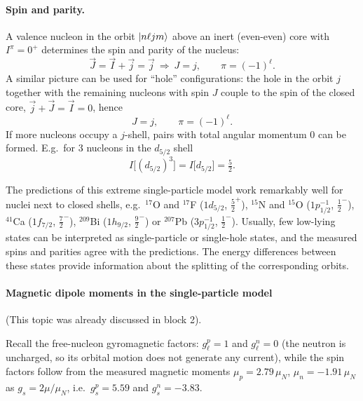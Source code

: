 \documentclass[11pt,a4paper]{article}
\begin{document}
\paragraph{Spin and parity.} A valence nucleon in the orbit $\ket{n\ell jm}$ above an inert (even-even) core with $I^\pi=0^+$ determines the spin and parity of the nucleus:
\[
\vec J=\vec I+\vec j=\vec j\ \Rightarrow\ J=j,\qquad \pi=(-1)^\ell .
\]
A similar picture can be used for ``hole'' configurations: the hole in the orbit $j$ together with the remaining nucleons with spin $J$ couple to the spin of the closed core, $\vec j+\vec J=\vec I=0$, hence
\[
J=j,\qquad \pi=(-1)^\ell .
\]
If more nucleons occupy a $j$-shell, pairs with total angular momentum 0 can be formed. E.g.\ for 3 nucleons in the $d_{5/2}$ shell
\[
I\big[(d_{5/2})^3\big]=I\big[d_{5/2}\big]=\tfrac52 .
\]

The predictions of this extreme single-particle model work remarkably well for nuclei next to closed shells, e.g.\ ${}^{17}$O and ${}^{17}$F ($1d_{5/2}$, $\frac52^+$), ${}^{15}$N and ${}^{15}$O ($1p_{1/2}^{-1}$, $\frac12^-$), ${}^{41}$Ca ($1f_{7/2}$, $\frac72^-$), ${}^{209}$Bi ($1h_{9/2}$, $\frac92^-$) or ${}^{207}$Pb ($3p_{1/2}^{-1}$, $\frac12^-$). Usually, few low-lying states can be interpreted as single-particle or single-hole states, and the measured spins and parities agree with the predictions. The energy differences between these states provide information about the splitting of the corresponding orbits.



\paragraph{Magnetic dipole moments in the single-particle model}
(This topic was already discussed in block 2). 
  
Recall the free-nucleon gyromagnetic factors: $g_\ell^p=1$ and $g_\ell^n=0$ (the neutron is uncharged, so its orbital motion does not generate any current), while the spin factors follow from the measured magnetic moments $\mu_p=2.79\,\mu_N$, $\mu_n=-1.91\,\mu_N$ as $g_s=2\mu/\mu_N$, i.e.\ $g_s^p=5.59$ and $g_s^n=-3.83$.
\end{document}

